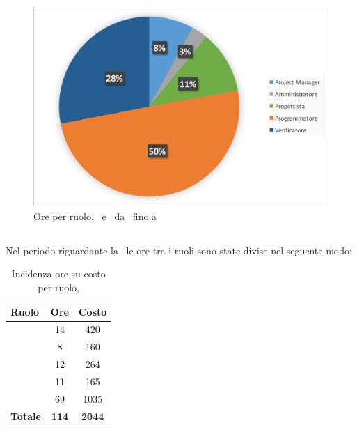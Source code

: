 \begin{figure}[H]
	\centering 
	\includegraphics[scale=0.7]{Immagini/GraficiTorteSezione6/COD.png}
	\caption{Ore per ruolo, \PD\ e \COD\ da \RP\ fino a \RQ}
\end{figure}

\newpage
\subsection{\VV}
Nel periodo riguardante la \VV\ le ore tra i ruoli sono state divise nel seguente modo:

\begin{table}[h]
	\begin{center}
		\begin{tabular}{|l|c|c|}
			\hline
			\textbf{Ruolo}	& \textbf{Ore} &	\textbf{Costo}	 \\
			\hline
			\textit{\Pm}	&	14	&	420		\\
			\hline
			\textit{\Am}	&	8	&	160		\\
			\hline
			\textit{\Prog}	&	12	&	264	\\
			\hline
			\textit{\Progr}	&	11	&	165	\\
			\hline
			\textit{\Ver}	&	69	&	1035	\\
			\hline
			\textbf{Totale}	&	\textbf{114}	&	\textbf{2044}	\\
			\hline
		\end{tabular}
	\end{center}
	\caption{Incidenza ore su costo per ruolo, \VV}
\end{table}

